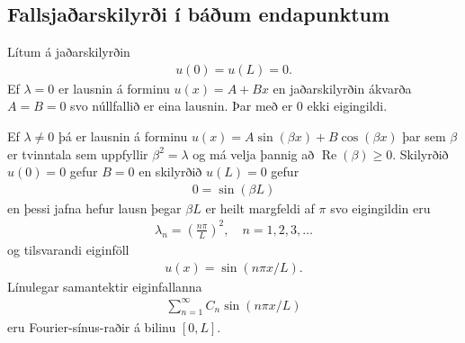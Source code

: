 \documentclass[a4paper,10pt,icelandic]{sphinxmanual}
\begin{document}
\subsection{Fallsjaðarskilyrði í báðum endapunktum}
\label{\detokenize{Kafli03:fallsjaarskilyri-i-baum-endapunktum}}
Lítum á jaðarskilyrðin
\begin{equation*}
\begin{split}u(0) = u(L) = 0.\end{split}
\end{equation*}
Ef \(\lambda = 0\) er lausnin á forminu \(u(x) = A+ Bx\) en jaðarskilyrðin ákvarða \(A=B=0\) svo núllfallið er eina lausnin. Þar með er 0 ekki eigingildi.

Ef \(\lambda \neq 0\) þá er lausnin á forminu \(u(x) = A \sin(\beta x) + B\cos(\beta x)\) þar sem \(\beta\) er tvinntala sem uppfyllir \(\beta^2 = \lambda\) og má velja þannig að \(\operatorname{Re}(\beta)\geq 0\). Skilyrðið \(u(0) = 0\) gefur \(B=0\) en skilyrðið \(u(L) = 0\) gefur
\begin{equation*}
\begin{split}0 = \sin(\beta L)\end{split}
\end{equation*}
en þessi jafna hefur lausn þegar \(\beta L\) er heilt margfeldi af \(\pi\) svo eigingildin eru
\begin{equation*}
\begin{split}\lambda_n = \left(\frac{n\pi}{L}\right)^2, \quad n = 1,2,3,\ldots\end{split}
\end{equation*}
og tilsvarandi eiginföll
\begin{equation*}
\begin{split}u(x) = \sin(n\pi x/L).\end{split}
\end{equation*}
Línulegar samantektir eiginfallanna
\begin{equation*}
\begin{split}\sum_{n=1}^\infty C_n \sin(n\pi x/L)\end{split}
\end{equation*}
eru Fourier-sínus-raðir á bilinu \([0,L]\).
\end{document}
